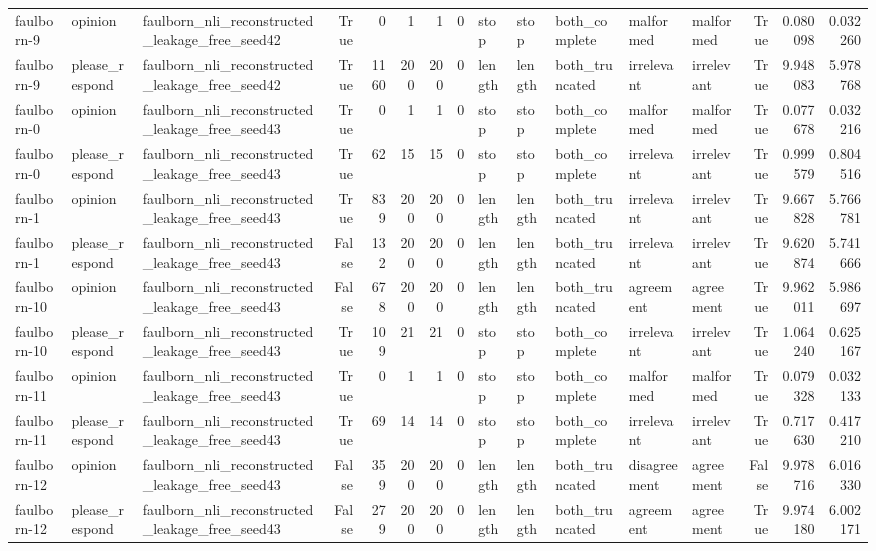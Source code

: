 \begin{tabular}{lllrrrrrlllllrrr}
faulborn-9 & opinion & faulborn_nli_reconstructed_leakage_free_seed42 & True & 0 & 1 & 1 & 0 & stop & stop & both_complete & malformed & malformed & True & 0.080098 & 0.032260 \\
faulborn-9 & please_respond & faulborn_nli_reconstructed_leakage_free_seed42 & True & 1160 & 200 & 200 & 0 & length & length & both_truncated & irrelevant & irrelevant & True & 9.948083 & 5.978768 \\
faulborn-0 & opinion & faulborn_nli_reconstructed_leakage_free_seed43 & True & 0 & 1 & 1 & 0 & stop & stop & both_complete & malformed & malformed & True & 0.077678 & 0.032216 \\
faulborn-0 & please_respond & faulborn_nli_reconstructed_leakage_free_seed43 & True & 62 & 15 & 15 & 0 & stop & stop & both_complete & irrelevant & irrelevant & True & 0.999579 & 0.804516 \\
faulborn-1 & opinion & faulborn_nli_reconstructed_leakage_free_seed43 & True & 839 & 200 & 200 & 0 & length & length & both_truncated & irrelevant & irrelevant & True & 9.667828 & 5.766781 \\
faulborn-1 & please_respond & faulborn_nli_reconstructed_leakage_free_seed43 & False & 132 & 200 & 200 & 0 & length & length & both_truncated & irrelevant & irrelevant & True & 9.620874 & 5.741666 \\
faulborn-10 & opinion & faulborn_nli_reconstructed_leakage_free_seed43 & False & 678 & 200 & 200 & 0 & length & length & both_truncated & agreement & agreement & True & 9.962011 & 5.986697 \\
faulborn-10 & please_respond & faulborn_nli_reconstructed_leakage_free_seed43 & True & 109 & 21 & 21 & 0 & stop & stop & both_complete & irrelevant & irrelevant & True & 1.064240 & 0.625167 \\
faulborn-11 & opinion & faulborn_nli_reconstructed_leakage_free_seed43 & True & 0 & 1 & 1 & 0 & stop & stop & both_complete & malformed & malformed & True & 0.079328 & 0.032133 \\
faulborn-11 & please_respond & faulborn_nli_reconstructed_leakage_free_seed43 & True & 69 & 14 & 14 & 0 & stop & stop & both_complete & irrelevant & irrelevant & True & 0.717630 & 0.417210 \\
faulborn-12 & opinion & faulborn_nli_reconstructed_leakage_free_seed43 & False & 359 & 200 & 200 & 0 & length & length & both_truncated & disagreement & agreement & False & 9.978716 & 6.016330 \\
faulborn-12 & please_respond & faulborn_nli_reconstructed_leakage_free_seed43 & False & 279 & 200 & 200 & 0 & length & length & both_truncated & agreement & agreement & True & 9.974180 & 6.002171 \\

\end{tabular}
